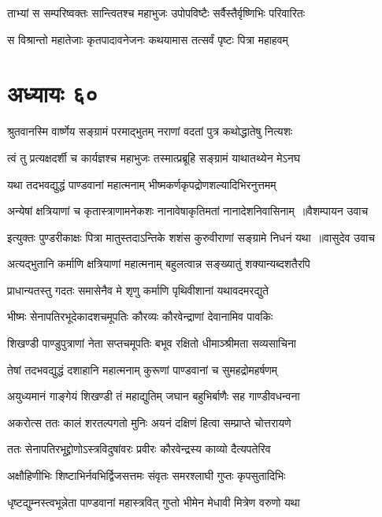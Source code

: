 \twolineshloka
{ताभ्यां स सम्परिष्वक्तः सान्त्वितश्च महाभुजः}
{उपोपविष्टैः सर्वैस्तैर्वृष्णिभिः परिवारितः}


\twolineshloka
{स विश्रान्तो महातेजाः कृतपादावनेजनः}
{कथयामास तत्सर्वं पृष्टः पित्रा महाहवम्}


\chapter{अध्यायः ६०}
\twolineshloka
{श्रुतवानस्मि वार्ष्णेय सङ्ग्रामं परमाद्भुतम्}
{नराणां वदतां पुत्र कथोद्धातेषु नित्यशः}


\twolineshloka
{त्वं तु प्रत्यक्षदर्शी च कार्यज्ञश्च महाभुजः}
{तस्मात्प्रब्रूहि सङ्ग्रामं याथातथ्येन मेऽनघ}


\twolineshloka
{यथा तदभवद्युद्धं पाण्डवानां महात्मनाम्}
{भीष्मकर्णकृपद्रोणशल्यादिभिरनुत्तमम्}


\threelineshloka
{अन्येषां क्षत्रियाणां च कृतास्त्राणामनेकशः}
{नानावेषाकृतिमतां नानादेशनिवासिनाम् ॥वैशम्पायन उवाच}
{}


\threelineshloka
{इत्युक्तः पुण्डरीकाक्षः पित्रा मातुस्तदाऽन्तिके}
{शशंस कुरुवीराणां सङ्ग्रामे निधनं यथा ॥वासुदेव उवाच}
{}


\twolineshloka
{अत्यद्भुतानि कर्माणि क्षत्रियाणां महात्मनाम्}
{बहुलत्वान्न सङ्ख्यातुं शक्यान्यब्दशतैरपि}


\twolineshloka
{प्राधान्यतस्तु गदतः समासेनैव मे शृणु}
{कर्माणि पृथिवीशानां यथावदमरद्युते}


\twolineshloka
{भीष्मः सेनापतिरभूदेकादशचमूपतिः}
{कौरव्यः कौरवेन्द्राणां देवानामिव पावकिः}


\twolineshloka
{शिखण्डी पाण्डुपुत्राणां नेता सप्तचमूपतिः}
{बभूव रक्षितो धीमाञ्श्रीमता सव्यसाचिना}


\twolineshloka
{तेषां तदभवद्युद्धं दशाहानि महात्मनाम्}
{कुरूणां पाण्डवानां च सुमहद्रोमहर्षणम्}


\twolineshloka
{अयुध्यमानं गाङ्गेयं शिखण्डी तं महाद्युतिम्}
{जघान बहुभिर्बाणैः सह गाण्डीवधन्वना}


\twolineshloka
{अकरोत्स ततः कालं शरतल्पगतो मुनिः}
{अयनं दक्षिणं हित्वा सम्प्राप्ते चोत्तरायणे}


\twolineshloka
{ततः सेनापतिरभूद्द्रोणोऽस्त्रविदुषांवरः}
{प्रवीरः कौरवेन्द्रस्य काव्यो दैत्यपतेरिव}


\twolineshloka
{अक्षौहिणीभिः शिष्टाभिर्नवभिर्द्विजसत्तमः}
{संवृतः समरश्लाघी गुप्तः कृपसुतादिभिः}


\twolineshloka
{धृष्टद्युम्नस्त्वभून्नेता पाण्डवानां महास्त्रवित्}
{गुप्तो भीमेन मेधावी मित्रेण वरुणो यथा}


